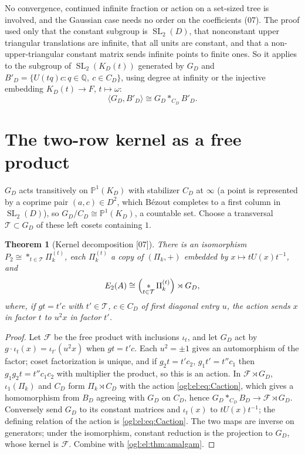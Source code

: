 \documentclass[11pt,oneside]{article}
\numberwithin{equation}{section}
\newtheorem{theorem}{Theorem}[section]
\theoremstyle{definition}
\theoremstyle{remark}
\newcommand{\Q}{\mathbb Q}
\newcommand{\PP}{\mathbb P}
\newcommand{\cT}{\mathcal T}
\newcommand{\cF}{\mathcal F}
\newcommand{\SL}{\operatorname{SL}}
\newcommand{\src}[1]{\textup{\textsf{\small[#1]}}}
\begin{document}
No convergence, continued infinite fraction or action on a set-sized tree is
involved, and the Gaussian case needs no order on the coefficients (07). The
proof used only that the constant subgroup is $\SL_2(D)$, that nonconstant upper
triangular translations are infinite, that all units are constant, and that a
non-upper-triangular constant matrix sends infinite points to finite ones. So it
applies to the subgroup of $\SL_2(K_D(t))$ generated by $G_D$ and
$B'_D=\{U(tq)c:q\in\Q,\ c\in C_D\}$, using degree at infinity or the injective
embedding $K_D(t)\to F$, $t\mapsto\omega$:
\begin{equation}\label{ogl:el:eq:targetamalgam}
 \langle G_D,B'_D\rangle\cong G_D*_{C_D}B'_D .
\end{equation}

\section{The two-row kernel as a free product}\label{ogl:el:sec:freeproduct}

$G_D$ acts transitively on $\PP^1(K_D)$ with stabilizer $C_D$ at $\infty$ (a
point is represented by a coprime pair $(a,c)\in D^2$, which B\'ezout completes
to a first column in $\SL_2(D)$), so $G_D/C_D\cong\PP^1(K_D)$, a countable set.
Choose a transversal $\cT\subset G_D$ of these left cosets containing $1$.

\begin{theorem}[Kernel decomposition \src{07}]\label{ogl:el:thm:freeproduct}
There is an isomorphism $P_2\cong\mathop{*}_{t\in\cT}\Pi_k^{(t)}$, each
$\Pi_k^{(t)}$ a copy of $(\Pi_k,+)$ embedded by $x\mapsto tU(x)t^{-1}$, and
\[
 E_2(A)\cong\Bigl(\mathop{*}_{t\in\cT}\Pi_k^{(t)}\Bigr)\rtimes G_D,
\]
where, if $gt=t'c$ with $t'\in\cT$, $c\in C_D$ of first diagonal entry $u$, the
action sends $x$ in factor $t$ to $u^2x$ in factor $t'$.
\end{theorem}
\begin{proof}
Let $\cF$ be the free product with inclusions $\iota_t$, and let $G_D$ act by
$g\cdot\iota_t(x)=\iota_{t'}(u^2x)$ when $gt=t'c$. Each $u^2=\pm1$ gives an
automorphism of the factor; coset factorization is unique, and if $g_2t=t'c_2$,
$g_1t'=t''c_1$ then $g_1g_2t=t''c_1c_2$ with multiplier the product, so this is
an action. In $\cF\rtimes G_D$, $\iota_1(\Pi_k)$ and $C_D$ form
$\Pi_k\rtimes C_D$ with the action \eqref{ogl:el:eq:Caction}, which gives a
homomorphism from $B_D$ agreeing with $G_D$ on $C_D$, hence
$G_D*_{C_D}B_D\to\cF\rtimes G_D$. Conversely send $G_D$ to its constant
matrices and $\iota_t(x)$ to $tU(x)t^{-1}$; the defining relation of the action
is \eqref{ogl:el:eq:Caction}. The two maps are inverse on generators; under the
isomorphism, constant reduction is the projection to $G_D$, whose kernel is
$\cF$. Combine with \cref{ogl:el:thm:amalgam}.
\end{proof}
\end{document}
